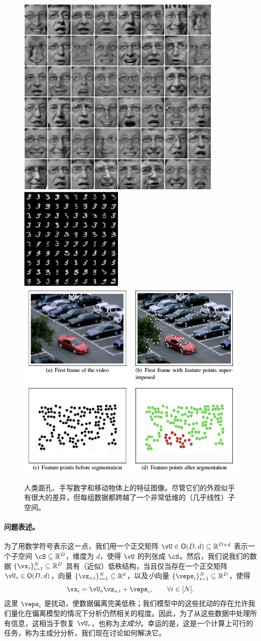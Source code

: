 \documentclass[../../book-main_zh.tex]{subfiles}
\begin{document}
\begin{figure}
    \centering
    \includegraphics[width=0.3\linewidth]{figs_chap2/faces.png}
    \includegraphics[width=0.295\linewidth]{figs_chap2/handwritten-digits.png}
    \includegraphics[width=0.35\linewidth]{figs_chap2/motion.png}    
    \caption{人类面孔、手写数字和移动物体上的特征图像。尽管它们的外观似乎有很大的差异，但每组数据都跨越了一个非常低维的（几乎线性）子空间。}
    \label{fig:enter-label}
\end{figure}

\paragraph{问题表述。}
为了用数学符号表示这一点，我们用一个正交矩阵 \(\vU \in \O(D, d) \subseteq \R^{D \times d}\) 表示一个子空间 \(\cS \subseteq \R^{D}\)，维度为 \(d\)，使得 \(\vU\) 的列张成 \(\cS\)。然后，我们说我们的数据 \(\{\vx_{i}\}_{i = 1}^{N} \subseteq \R^{D}\) 具有（近似）低秩结构，当且仅当存在一个正交矩阵 \(\vU_{o} \in \O(D, d)\)，向量 \(\{\vz_{o, i}\}_{i = 1}^{N} \subseteq \R^{d}\)，以及\textit{小}向量 \(\{\veps_{i}\}_{i = 1}^{N} \subseteq \R^{D}\)，使得
\begin{equation}\label{eq:pca_dgp}
    \vx_{i} = \vU_{o}\vz_{o, i} + \veps_{i}, \qquad \forall i \in [N].
\end{equation}
这里 \(\veps_{i}\) 是扰动，使数据偏离完美低秩；我们模型中的这些扰动的存在允许我们量化在偏离模型的情况下分析仍然相关的程度。因此，为了从这些数据中处理所有信息，这相当于恢复 \(\vU_{o}\)，也称为\textit{主成分}。幸运的是，这是一个计算上可行的任务，称为主成分分析，我们现在讨论如何解决它。
\end{document}
